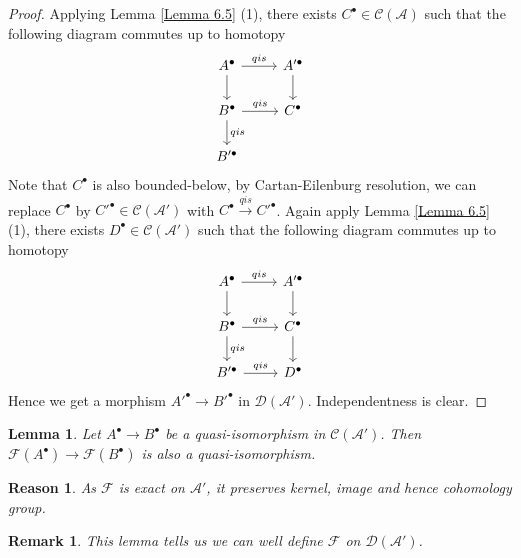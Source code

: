 \documentclass{ctexart}
\newtheorem{remark}{Remark}[section]
\newtheorem{lemma}{Lemma}[section]
\newtheorem{reason}{Reason}[section]
\begin{document}
\begin{proof}
    Applying Lemma \ref{Lemma 6.5} (1), there exists $C^{\bullet}\in \mathcal{C}(\mathscr{A})$ such that the following diagram commutes up to homotopy
    \begin{equation}
        \begin{tikzcd}
            A^{\bullet} \arrow[r, "qis"] \arrow[d] &
            A'^{\bullet} \arrow[d] \\
            B^{\bullet} \arrow[r, "qis"] \arrow[d, "qis"] &
            C^{\bullet} \\
            B'^{\bullet} &
        \end{tikzcd}
    \end{equation}
    Note that $C^{\bullet}$ is also bounded-below, by Cartan-Eilenburg resolution, we can replace $C^{\bullet}$ by $C'^{\bullet}\in \mathcal{C}(\mathscr{A}')$ with $C^{\bullet} \overset{qis}{\rightarrow} C'^{\bullet}$.
    Again apply Lemma \ref{Lemma 6.5} (1), there exists $D^{\bullet}\in \mathcal{C}(\mathscr{A}')$ such that the following diagram commutes up to homotopy
    \begin{equation}
        \begin{tikzcd}
            A^{\bullet} \arrow[r, "qis"] \arrow[d] &
            A'^{\bullet} \arrow[d] \\
            B^{\bullet} \arrow[r, "qis"] \arrow[d, "qis"] &
            C^{\bullet} \arrow[d] \\
            B'^{\bullet} \arrow[r, "qis"] &
            D^{\bullet}
        \end{tikzcd}
    \end{equation}
    Hence we get a morphism $A'^{\bullet} \rightarrow B'^{\bullet}$ in $\mathcal{D}(\mathscr{A}')$.
    Independentness is clear.
\end{proof}
\begin{lemma}
    Let $A^{\bullet} \rightarrow B^{\bullet}$ be a quasi-isomorphism in $\mathcal{C}(\mathscr{A}')$.
    Then $\mathcal{F}(A^{\bullet}) \rightarrow \mathcal{F}(B^{\bullet})$ is also a quasi-isomorphism.
    \label{Lemma 6.10}
\end{lemma}
\begin{reason}
    As $\mathcal{F}$ is exact on $\mathscr{A}'$, it preserves kernel, image and hence cohomology group.
\end{reason}
\begin{remark}
    This lemma tells us we can well define $\mathcal{F}$ on $\mathcal{D}(\mathscr{A}')$.
\end{remark}
\end{document}
